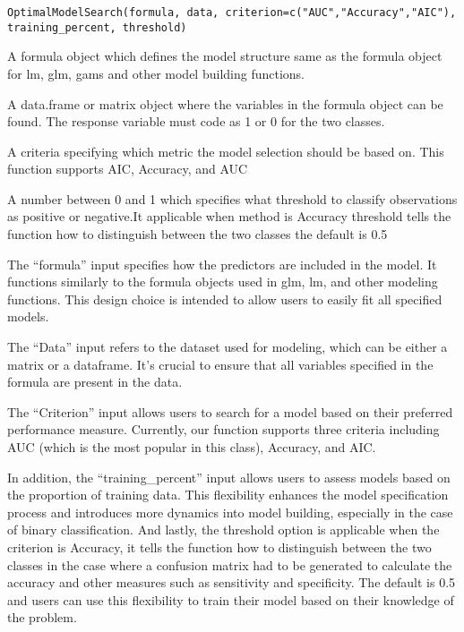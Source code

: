 \documentclass[a4paper]{book}
\begin{document}
%
\begin{Usage}
\begin{verbatim}
OptimalModelSearch(formula, data, criterion=c("AUC","Accuracy","AIC"),
training_percent, threshold)

\end{verbatim}
\end{Usage}
%
\begin{Arguments}
\begin{ldescription}
\item[\code{formula}] A formula object which defines the model structure same as the formula object
for lm, glm, gams and other model building functions.

\item[\code{data}] A data.frame or matrix object where the variables in the formula object can be found. The response variable must code as 1 or 0 for the two classes.

\item[\code{criterion}]  A criteria specifying which metric the model selection should be based on. This function supports AIC, Accuracy, and AUC

\item[\code{threshold}]  A number between 0 and 1 which specifies what threshold to classify
observations as positive or negative.It applicable when method is Accuracy
threshold tells the function how to distinguish between the two classes
the default is 0.5 

\end{ldescription}
\end{Arguments}
%
\begin{Details}
The “formula” input specifies how the predictors are included in the model. It functions similarly to the formula objects used in glm, lm, and other modeling functions. This design choice is intended to allow users to easily fit all specified models.


The “Data” input refers to the dataset used for modeling, which can be either a matrix or a dataframe. It’s crucial to ensure that all variables specified in the formula are present in the data.

The “Criterion” input allows users to search for a model based on their preferred performance measure. Currently, our function supports three criteria including AUC (which is the most popular in this class), Accuracy, and AIC.

In addition, the “training\_percent” input allows users to assess models based on the proportion of training data. This flexibility enhances the model specification process and introduces more dynamics into model building, especially in the case of binary classification. And lastly, the threshold option is applicable when the criterion is Accuracy, it tells the function how to distinguish between the two classes in the case where a confusion matrix had to be generated  to calculate the accuracy and other measures such as sensitivity and specificity. The default is 0.5 and users can use this flexibility to train their model based on their knowledge of the problem.


\end{Details}
\end{document}

